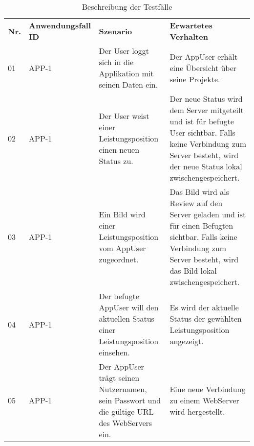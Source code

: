 \centering
\begin{longtable}[c]{|p{1cm}|p{3cm}|p{4cm}|p{6cm}|}
    \caption{Beschreibung der Testfälle}
    \label{fig:testfälle}
    \endlastfoot
    \hline \multicolumn{4}{|r|}{{Weitergeführt auf der folgenden Seite}}                                                                                                                                                                                                                                                                        \\ \hline
    \endfoot
    \hline
    \textbf{Nr.} & \textbf{Anwendungsfall ID} & \textbf{Szenario}                                                                                                  & \textbf{Erwartetes Verhalten}                                                                                                                                              \\ \hline
    \endhead
    \hline
    01           & APP-1                      & Der User loggt sich in die Applikation mit seinen Daten ein.                                                       & Der AppUser erhält eine Übersicht über seine Projekte. \\ \hline
    02           & APP-1                      & Der User weist einer Leistungsposition einen neuen Status zu.                                                     & Der neue Status wird dem Server mitgeteilt und ist für befugte User sichtbar. Falls keine Verbindung zum Server besteht, wird der neue Status lokal zwischengespeichert. \\ \hline
    03           & APP-1                      & Ein Bild wird einer Leistungsposition vom AppUser zugeordnet.                                                       & Das Bild wird als Review auf den Server geladen und ist für einen Befugten sichtbar. Falls keine Verbindung zum Server besteht, wird das Bild lokal zwischengespeichert.   \\ \hline
    04           & APP-1                      & Der befugte AppUser will den aktuellen Status einer Leistungsposition einsehen.                                     & Es wird der aktuelle Status der gewählten Leistungsposition angezeigt.                                                                                                     \\ \hline
    05           & APP-1                      & Der AppUser trägt seinen Nutzernamen, sein Passwort und die gültige URL des WebServers ein.                        & Eine neue Verbindung zu einem WebServer wird hergestellt.                                                                                                                  \\ \hline

\end{longtable}

